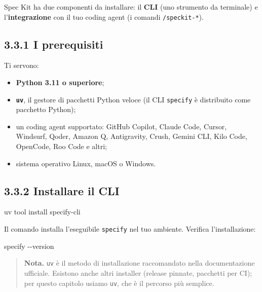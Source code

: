 \documentclass[
  italian,
  10pt,
]{book}
\newenvironment{Shaded}{\begin{snugshade}}{\end{snugshade}}
\newcommand{\AttributeTok}[1]{\textcolor[rgb]{0.13,0.29,0.53}{#1}}
\newcommand{\ExtensionTok}[1]{#1}
\newcommand{\NormalTok}[1]{#1}
\providecommand{\tightlist}{%
  \setlength{\itemsep}{0pt}\setlength{\parskip}{0pt}}
\begin{document}
Spec Kit ha due componenti da installare: il \textbf{CLI} (uno strumento
da terminale) e l'\textbf{integrazione} con il tuo coding agent (i
comandi \texttt{/speckit-*}).

\subsection{3.3.1 I prerequisiti}\label{i-prerequisiti}

Ti servono:

\begin{itemize}
\tightlist
\item
  \textbf{Python 3.11 o superiore};
\item
  \textbf{\texttt{uv}}, il gestore di pacchetti Python veloce (il CLI
  \texttt{specify} è distribuito come pacchetto Python);
\item
  un coding agent supportato: GitHub Copilot, Claude Code, Cursor,
  Windsurf, Qoder, Amazon Q, Antigravity, Crush, Gemini CLI, Kilo Code,
  OpenCode, Roo Code e altri;
\item
  sistema operativo Linux, macOS o Windows.
\end{itemize}

\subsection{3.3.2 Installare il CLI}\label{installare-il-cli}

\begin{Shaded}
\begin{Highlighting}[]
\ExtensionTok{uv}\NormalTok{ tool install specify{-}cli}
\end{Highlighting}
\end{Shaded}

Il comando installa l'eseguibile \texttt{specify} nel tuo ambiente.
Verifica l'installazione:

\begin{Shaded}
\begin{Highlighting}[]
\ExtensionTok{specify} \AttributeTok{{-}{-}version}
\end{Highlighting}
\end{Shaded}

\begin{quote}
\textbf{Nota.} \texttt{uv} è il metodo di installazione raccomandato
nella documentazione ufficiale. Esistono anche altri installer (release
pinnate, pacchetti per CI); per questo capitolo usiamo \texttt{uv}, che
è il percorso più semplice.
\end{quote}
\end{document}
